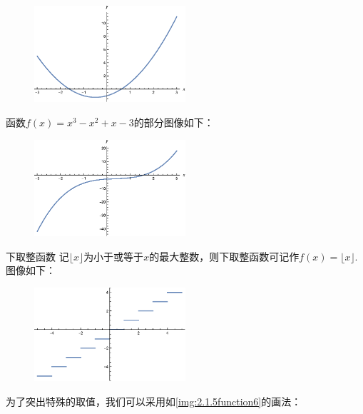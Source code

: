 \documentclass[lang=cn,math=cm,chinesefont=nofont,11pt,scheme=chinese,twocol]{elegantbook}
\begin{document}
\begin{figure}[h]
  \centering
  \includegraphics[width=0.5\textwidth]{image/2.1.5function1.eps}
  \label{img:2.1.5function1}
\end{figure}

\begin{example}
  函数$f(x)=x^3-x^2+x-3$的部分图像如下：
\end{example}

\begin{figure}[h]
  \centering
  \includegraphics[width=0.5\textwidth]{image/2.1.5function2.eps}
  \label{img:2.1.5function2}
\end{figure}

\begin{example}{下取整函数}
  记$\lfloor x\rfloor $为小于或等于$x$的最大整数，则下取整函数可记作$f(x)=\lfloor x\rfloor$.图像如下：
\end{example}

\begin{figure}[h]
  \centering
  \includegraphics[width=0.5\textwidth]{image/2.1.5function5.eps}
  \label{img:2.1.5function5}
\end{figure}

为了突出特殊的取值，我们可以采用如\ref{img:2.1.5function6}的画法：
\end{document}
